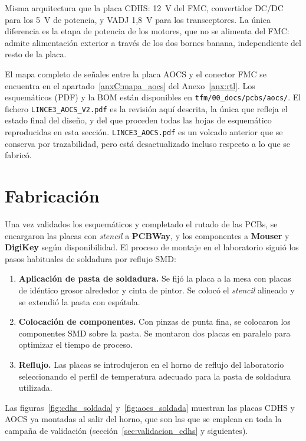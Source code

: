 Misma arquitectura que la placa CDHS: 12~V del FMC, convertidor DC/DC para los 5~V de
potencia, y VADJ 1,8~V para los transceptores. La única diferencia es la etapa de potencia de
los motores, que no se alimenta del FMC: admite alimentación exterior a través de los dos
bornes banana, independiente del resto de la placa.

El mapa completo de señales entre la placa AOCS y el conector FMC se encuentra en el
apartado~\ref{anxC:mapa_aocs} del Anexo~\ref{anx:rtl}. Los esquemáticos (PDF) y la BOM están disponibles en
\texttt{tfm/00\_docs/pcbs/aocs/}. El fichero \texttt{LINCE3\_AOCS\_V2.pdf} es la revisión aquí
descrita, la única que refleja el estado final del diseño, y del que proceden todas las hojas de
esquemático reproducidas en esta sección. \texttt{LINCE3\_AOCS.pdf} es un volcado anterior que se
conserva por trazabilidad, pero está desactualizado incluso respecto a lo que se fabricó.

\section{Fabricación}

Una vez validados los esquemáticos y completado el rutado de las PCBs, se encargaron las
placas con \textit{stencil} a \textbf{PCBWay}, y los componentes a \textbf{Mouser} y \textbf{DigiKey} según
disponibilidad. El proceso de montaje en el laboratorio siguió los pasos habituales de
soldadura por reflujo SMD:

\begin{enumerate}
    \item \textbf{Aplicación de pasta de soldadura.} Se fijó la placa a la mesa con placas de
    idéntico grosor alrededor y cinta de pintor. Se colocó el \textit{stencil} alineado y se extendió
    la pasta con espátula.
    \item \textbf{Colocación de componentes.} Con pinzas de punta fina, se colocaron los
    componentes SMD sobre la pasta. Se montaron dos placas en paralelo para optimizar el
    tiempo de proceso.
    \item \textbf{Reflujo.} Las placas se introdujeron en el horno de reflujo del laboratorio
    seleccionando el perfil de temperatura adecuado para la pasta de soldadura utilizada.
\end{enumerate}

Las figuras~\ref{fig:cdhs_soldada} y~\ref{fig:aocs_soldada} muestran las placas CDHS y AOCS ya
montadas al salir del horno, que son las que se emplean en toda la campaña de validación
(sección~\ref{sec:validacion_cdhs} y siguientes).

